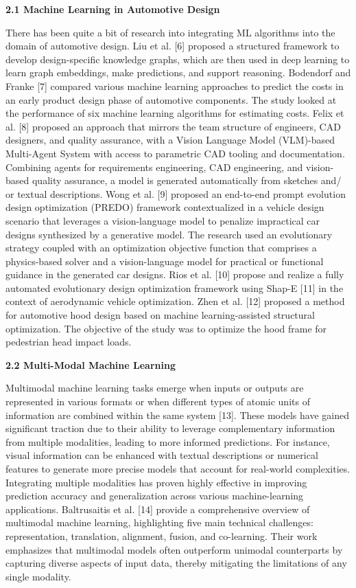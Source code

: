 \documentclass[11pt]{article}
\begin{document}
\textbf{2.1 Machine Learning in Automotive Design}

There has been quite a bit of research into integrating ML algorithms
into the domain of automotive design. Liu et al. {[}6{]} proposed a
structured framework to develop design-specific knowledge graphs, which
are then used in deep learning to learn graph embeddings, make
predictions, and support reasoning. Bodendorf and Franke {[}7{]}
compared various machine learning approaches to predict the costs in an
early product design phase of automotive components. The study looked at
the performance of six machine learning algorithms for estimating costs.
Felix et al. {[}8{]} proposed an approach that mirrors the team
structure of engineers, CAD designers, and quality assurance, with a
Vision Language Model (VLM)-based Multi-Agent System with access to
parametric CAD tooling and documentation. Combining agents for
requirements engineering, CAD engineering, and vision-based quality
assurance, a model is generated automatically from sketches and/ or
textual descriptions. Wong et al. {[}9{]} proposed an end-to-end prompt
evolution design optimization (PREDO) framework contextualized in a
vehicle design scenario that leverages a vision-language model to
penalize impractical car designs synthesized by a generative model. The
research used an evolutionary strategy coupled with an optimization
objective function that comprises a physics-based solver and a
vision-language model for practical or functional guidance in the
generated car designs. Rios et al. {[}10{]} propose and realize a fully
automated evolutionary design optimization framework using Shap-E
{[}11{]} in the context of aerodynamic vehicle optimization. Zhen et al.
{[}12{]} proposed a method for automotive hood design based on machine
learning-assisted structural optimization. The objective of the study
was to optimize the hood frame for pedestrian head impact loads.

\textbf{2.2 Multi-Modal Machine Learning}

Multimodal machine learning tasks emerge when inputs or outputs are
represented in various formats or when different types of atomic units
of information are combined within the same system {[}13{]}. These
models have gained significant traction due to their ability to leverage
complementary information from multiple modalities, leading to more
informed predictions. For instance, visual information can be enhanced
with textual descriptions or numerical features to generate more precise
models that account for real-world complexities. Integrating multiple
modalities has proven highly effective in improving prediction accuracy
and generalization across various machine-learning applications.
Baltrusaitis et al. {[}14{]} provide a comprehensive overview of
multimodal machine learning, highlighting five main technical
challenges: representation, translation, alignment, fusion, and
co-learning. Their work emphasizes that multimodal models often
outperform unimodal counterparts by capturing diverse aspects of input
data, thereby mitigating the limitations of any single modality.
\end{document}
